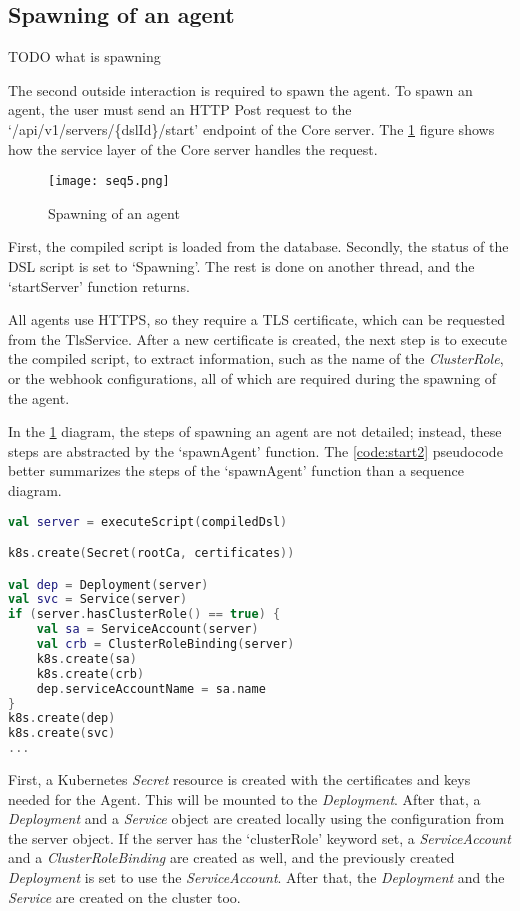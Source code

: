 \subsection{Spawning of an agent}
\label{sec:spawning}

TODO what is spawning

The second outside interaction is required to spawn the agent. To spawn an agent, the user must send an HTTP Post request to the `/api/v1/servers/\{dslId\}/start' endpoint of the Core server. The \ref{fig:start1} figure shows how the service layer of the Core server handles the request.

\begin{figure}[h]
    \centering
    \texttt{[image: seq5.png]}
    \caption{Spawning of an agent}
    \label{fig:start1}
\end{figure}

First, the compiled script is loaded from the database. Secondly, the status of the DSL script is set to `Spawning'. The rest is done on another thread, and the `startServer' function returns.

All agents use HTTPS, so they require a TLS certificate, which can be requested from the TlsService.
After a new certificate is created, the next step is to execute the compiled script, to extract information, such as the name of the \emph{ClusterRole}, or the webhook configurations, all of which are required during the spawning of the agent.

In the \ref{fig:start1} diagram, the steps of spawning an agent are not detailed; instead, these steps are abstracted by the `spawnAgent' function. The \ref{code:start2} pseudocode better summarizes the steps of the `spawnAgent' function than a sequence diagram.

\begin{lstlisting}[caption={Spawning of an agent},language=Kotlin,label=code:start2]
val server = executeScript(compiledDsl)

k8s.create(Secret(rootCa, certificates))

val dep = Deployment(server)
val svc = Service(server)
if (server.hasClusterRole() == true) {
    val sa = ServiceAccount(server)
    val crb = ClusterRoleBinding(server)
    k8s.create(sa)
    k8s.create(crb)
    dep.serviceAccountName = sa.name
}
k8s.create(dep)
k8s.create(svc)
...
\end{lstlisting}

First, a Kubernetes \emph{Secret} resource is created with the certificates and keys needed for the Agent. This will be mounted to the \emph{Deployment}.
After that, a \emph{Deployment} and a \emph{Service} object are created locally using the configuration from the server object. If the server has the `clusterRole' keyword set, a \emph{ServiceAccount} and a \emph{ClusterRoleBinding} are created as well, and the previously created \emph{Deployment} is set to use the \emph{ServiceAccount}. After that, the \emph{Deployment} and the \emph{Service} are created on the cluster too.


